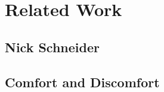 \chapter{Related Work}\label{chapter:related}

\section{Nick Schneider}

\section{Comfort and Discomfort}